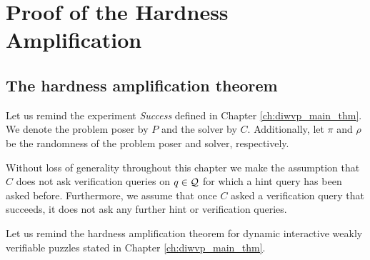 %
\section{Proof of the Hardness Amplification}
\label{st:main_theorem}%
\subsection{The hardness amplification theorem}
\label{subst:main_theorem}%
Let us remind the experiment \textit{Success} defined in Chapter \ref{ch:diwvp_main_thm}.
We denote the problem poser by $P$ and the solver by $C$. Additionally, let $\pi$ and $\rho$ be the randomness of the problem poser and solver, respectively.

\success*

Without loss of generality throughout this chapter we make the assumption that $C$ does not ask verification queries on $q \in \mathcal{Q}$
for which a hint query has been asked before. Furthermore, we assume that once $C$ asked
a verification query that succeeds, it does not ask any further hint or verification queries.

Let us remind the hardness amplification theorem for dynamic interactive weakly verifiable puzzles stated in Chapter \ref{ch:diwvp_main_thm}.

\hardnessAmpfDiwvp*
%
